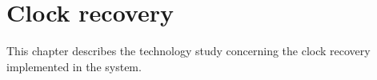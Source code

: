 \chapter{Clock recovery}
This chapter describes the technology study concerning the clock recovery implemented in the system.

